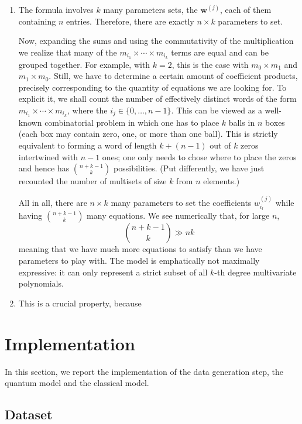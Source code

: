 \documentclass{article}
\theoremstyle{definition}
\theoremstyle{plain}
\begin{document}
\begin{enumerate}
    \item The formula involves $k$ many parameters sets, the $\mathbf{w}^{(j)}$, each of them containing $n$ entries. Therefore, there are exactly $n \times k$ parameters to set.
    
    Now, expanding the sums and using the commutativity of the multiplication we realize that many of the $m_{i_1} \times \cdots \times m_{i_k}$ terms are equal and can be grouped together. For example, with $k=2$, this is the case with $m_0 \times m_1$ and $m_1 \times m_0$. 
    Still, we have to determine a certain amount of coefficient products, precisely corresponding to the quantity of equations we are looking for. To explicit it, we shall count the number of effectively distinct words of the form $m_{i_1} \times \cdots \times m_{i_k}$, where the $i_j \in \{0, \dots, n-1\}$. 
    This can be viewed as a well-known combinatorial problem in which one has to place $k$ balls in $n$ boxes (each box may contain zero, one, or more than one ball). This is strictly equivalent to forming a word of length $k + (n-1)$ out of $k$ zeros intertwined with $n-1$ ones; one only needs to chose where to place the zeros and hence has $\binom{n+k-1}{k}$ possibilities. (Put differently, we have just recounted the number of multisets of size $k$ from $n$ elements.)

    All in all, there are $n \times k$ many parameters to set the coefficients $w_{i_l}^{(j)}$ while having $\binom{n+k-1}{k}$ many equations. We see numerically that, for large $n$,
    \[ \binom{n+k-1}{k} \gg nk \]
    meaning that we have much more equations to satisfy than we have parameters to play with. The model is emphatically not maximally expressive: it can only represent a strict subset of all $k$-th degree multivariate polynomials.

    \item 
    This is a crucial property, because


\end{enumerate}


\section{Implementation}

In this section, we report the implementation of the data generation step, the quantum model and the classical model.

\subsection{Dataset}
\end{document}
